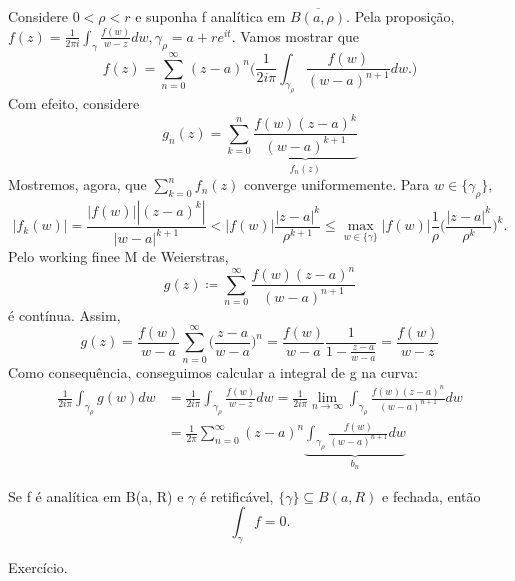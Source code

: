 \documentclass[complex.tex]{subfiles}
\begin{document}
\begin{proof*}
	Considere $0<\rho<r$ e suponha f analítica em $\overline{B(a, \rho)}$. Pela proposição, $f(z) =\displaystyle \frac{1}{2\pi i}\int_{\gamma}^{}\frac{f(w)}{w-z}dw,
		\gamma_{\rho} = a + r e^{it}.$ Vamos mostrar que
	$$
		f(z) = \sum\limits_{n=0}^{\infty}(z-a)^n\biggl(\frac{1}{2i \pi}\int_{\gamma_{\rho}}^{}\frac{f(w)}{(w-a)^{n+1}}dw.\biggr)
	$$
	Com efeito, considere
	$$
		g_{n}(z) = \sum\limits_{k=0}^{n}\underbrace{\frac{f(w)(z-a)^{k}}{(w-a)^{k+1}}}_{f_{n}(z)}
	$$
	Mostremos, agora, que $\sum\limits_{k=0}^{n}f_{n}(z)$ converge uniformemente. Para $w\in{\{\gamma_{\rho}\}},$
	$$
		|f_{k}(w)| = \frac{|f(w)||(z-a)^{k}|}{|w-a|^{k+1}} < |f(w)|\frac{|z-a|^{k}}{\rho^{k+1}}\leq \max_{w\in \{\gamma\}}|f(w)|\frac{1}{\rho}\biggl(\frac{|z-a|^k}{\rho^k}\biggr)^{k}.
	$$
	Pelo working finee M de Weierstras,
	$$
		g(z)\coloneqq \sum\limits_{n=0}^{\infty}\frac{f(w)(z-a)^{n}}{(w-a)^{n+1}}
	$$
	é contínua. Assim,
	$$
		g(z) = \frac{f(w)}{w - a}\sum\limits_{n=0}^{\infty}\biggl(\frac{z-a}{w-a}\biggr)^{n} = \frac{f(w)}{w-a}\frac{1}{1-\frac{z-a}{w-a}} = \frac{f(w)}{w-z}
	$$
	Como consequência, conseguimos calcular a integral de g na curva:
	\begin{align*}
		\frac{1}{2i \pi}\int_{\gamma_{\rho}}^{}g(w)dw & = \frac{1}{2i \pi}\int_{\gamma_{\rho}}^{}\frac{f(w)}{w-z}dw = \frac{1}{2i \pi}\lim_{n\to\infty}\int_{\gamma_{\rho}}\frac{f(w)(z-a)^{n}}{(w-a)^{n+1}}dw \\
		                                              & = \frac{1}{2\pi}\sum\limits_{n=0}^{\infty}(z-a)^{n}\underbrace{\int_{\gamma_{\rho}}^{}\frac{f(w)}{(w-a)^{n+1}}dw}_{b_{n}}
	\end{align*}
\end{proof*}
\begin{crl*}
	Se f é analítica em B(a, R) e $\gamma$ é retificável, $\{\gamma\}\subseteq{B(a, R)}$ e fechada, então
	$$
		\int_{\gamma}^{}f = 0.
	$$
\end{crl*}
\begin{proof*}
	Exercício.
\end{proof*}
\end{document}
